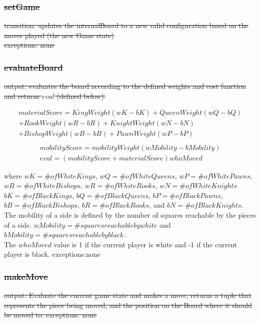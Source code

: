 \documentclass[12pt, titlepage]{article}
\begin{document}
        \subsubsection*{\sout{setGame} }
            \sout{transition: updates the internalBoard to a new valid configuration based on the moves played (the new Game state)\\
            exceptions: none}
        
        \subsubsection*{\sout{evaluateBoard}}
            \sout{output: evaluates the board according to the defined weights
            and cost function and returns $eval$ (defined below).}
            \begin{center}
            \begin{multline*}
                materialScore = KingWeight (wK-bK) + QueenWeight  (wQ-bQ)\\
                           + RookWeight (wR-bR)+ KnightWeight(wN-bN)\\
                           + BishopWeight (wB-bB) + PawnWeight (wP-bP)\\
            \end{multline*}
            \begin{gather*}
              mobilityScore = mobilityWeight (wMobility-bMobility)\\
              eval = (mobilityScore+materialScore)whoMoved
            \end{gather*}
            \end{center}
            where $wK = \# of White Kings$, $wQ = \# of White Queens$,
            $wP = \# of White Pawns$,\\ $wB = \# of White Bishops$, $wR = \# of White Rooks$, $wN = \# of White Knights$\\
            $bK = \# of Black Kings$, $bQ = \# of Black Queens$,
            $bP = \# of Black Pawns$,\\ $bB = \# of Black Bishops$, $bR = \# of Black Rooks$, and $bN = \# of Black Knights$.\\
            
           The mobility of a side is defined by the number of squares reachable by the pieces of a side. $wMobility = \# squares reachable by white$ and $bMobility = \# squares reachable by black$.\\
            
            The $whoMoved$ value is 1 if the current player is white and -1 if the current player is black.
            exceptions:none
        
        \subsubsection*{\sout{makeMove}}
        \sout{output: Evaluate the current game state and makes a move, returns a tuple that represents the piece being moved, and the position on the Board where it should be moved to.
        exceptions: none}
            
\end{document}

